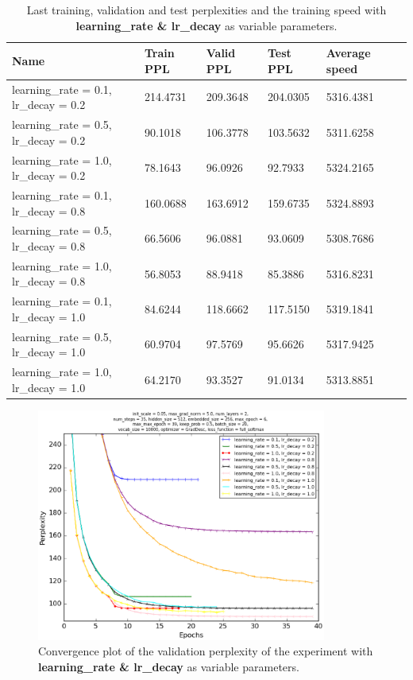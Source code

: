 \documentclass[10pt,a4paper,titlepage]{article}
\begin{document}
\begin{table}[H]
\centering
\caption{Last training, validation and test perplexities and the training speed with \textbf{learning\_rate \& lr\_decay} as variable parameters.}
\label{tab:exp1data}
\begin{tabular}{|l|l|l|l|l|l|}
\hline
{\small Name} & {\small Train PPL} & {\small Valid PPL} & {\small Test PPL} & {\small Average speed}\\ \hline
{\small learning\_rate = 0.1, lr\_decay} = 0.2           & 214.4731   & 209.3648   & 204.0305   & 5316.4381  \\ \hline
{\small learning\_rate = 0.5, lr\_decay} = 0.2           & 90.1018    & 106.3778   & 103.5632   & 5311.6258  \\ \hline
{\small learning\_rate = 1.0, lr\_decay} = 0.2           & 78.1643    & 96.0926    & 92.7933    & 5324.2165  \\ \hline
{\small learning\_rate = 0.1, lr\_decay} = 0.8           & 160.0688   & 163.6912   & 159.6735   & 5324.8893  \\ \hline
{\small learning\_rate = 0.5, lr\_decay} = 0.8           & 66.5606    & 96.0881    & 93.0609    & 5308.7686  \\ \hline
{\small learning\_rate = 1.0, lr\_decay} = 0.8           & 56.8053    & 88.9418    & 85.3886    & 5316.8231  \\ \hline
{\small learning\_rate = 0.1, lr\_decay} = 1.0           & 84.6244    & 118.6662   & 117.5150   & 5319.1841  \\ \hline
{\small learning\_rate = 0.5, lr\_decay} = 1.0           & 60.9704    & 97.5769    & 95.6626    & 5317.9425  \\ \hline
{\small learning\_rate = 1.0, lr\_decay} = 1.0           & 64.2170    & 93.3527    & 91.0134    & 5313.8851  \\ \hline
\end{tabular}
\end{table}

\begin{figure}[H]
	\begin{center}
		\includegraphics[width=0.85\textwidth]{Figures/learninglrdecayperf.eps}
		\caption{Convergence plot of the validation perplexity of the experiment with \textbf{learning\_rate \& lr\_decay} as variable parameters. }
		\label{fig:exp1perf}
	\end{center}	
\end{figure}
\end{document}
